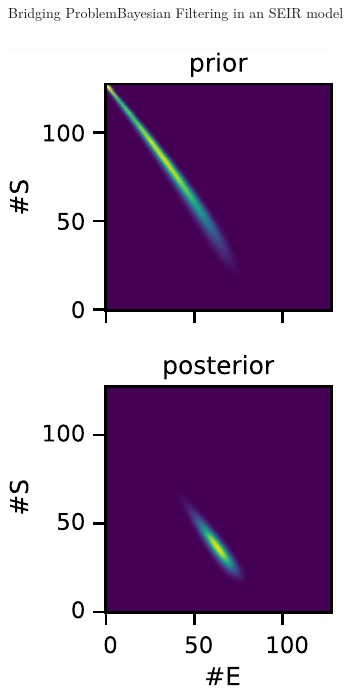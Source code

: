 \documentclass[10pt]{beamer}
\newcommand{\bottomcite}[1]{\vspace*{\fill} {\scriptsize \parencite{#1}}}
\begin{document}
\begin{frame}{Bridging Problem}{Bayesian Filtering in an SEIR model}
\begin{columns}
\begin{column}{.25\paperwidth}
            \includegraphics[width=.8\textwidth]{../gfx/prior_posterior_vert.pdf}
        \end{column}
    \end{columns}
    \bottomcite{backenkohler2020analysis}
\end{frame}
    
\end{document}

